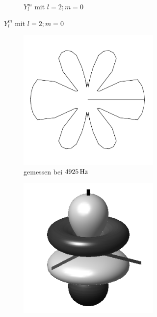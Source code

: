 \documentclass[numbers=noenddot,12pt,a4paper]{scrartcl}
\begin{document}
\begin{figure}[H]
\begin{subfigure}[h]{0.3\textwidth}
\begin{subfigure}[b]{\textwidth}
			\caption{$Y_l^m$ mit $l=2;m=0$} \label{img:l2y}
			\end{subfigure}
		\end{subfigure}
			\begin{subfigure}[h]{0.3\textwidth}
	\begin{subfigure}[b]{\textwidth}
		\includegraphics[angle=90,origin=c,width=\textwidth]{messwerte/polarl3.pdf}
		\caption{gemessen bei $\unit[4925]{Hz}$} \label{img:l3}
		\end{subfigure}
		\begin{subfigure}[b]{\textwidth}
			\includegraphics[width=\textwidth]{Spherical_Harmonics_deg3l3m0.png}

\end{subfigure}
\end{subfigure}
\end{figure}
\end{document}
